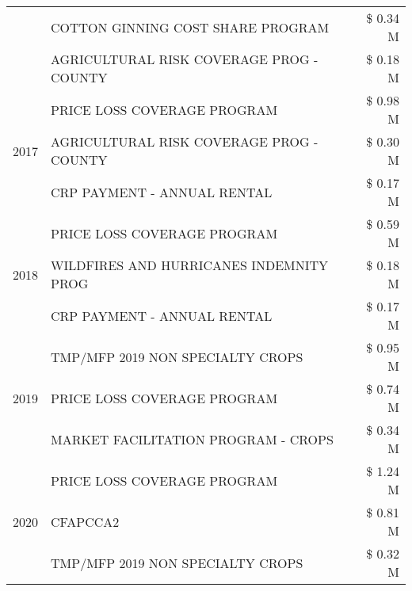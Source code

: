 \begin{tabular}{llr}
 & COTTON GINNING COST SHARE PROGRAM             & \$ 0.34 M \\
 & AGRICULTURAL RISK COVERAGE PROG - COUNTY      & \$ 0.18 M \\
\cline{1-3}
\multirow[t]{3}{*}{2017} & PRICE LOSS COVERAGE PROGRAM & \$ 0.98 M \\
 & AGRICULTURAL RISK COVERAGE PROG - COUNTY & \$ 0.30 M \\
 & CRP PAYMENT - ANNUAL RENTAL & \$ 0.17 M \\
\cline{1-3}
\multirow[t]{3}{*}{2018} & PRICE LOSS COVERAGE PROGRAM & \$ 0.59 M \\
 & WILDFIRES AND HURRICANES INDEMNITY PROG & \$ 0.18 M \\
 & CRP PAYMENT - ANNUAL RENTAL & \$ 0.17 M \\
\cline{1-3}
\multirow[t]{3}{*}{2019} & TMP/MFP 2019 NON SPECIALTY CROPS & \$ 0.95 M \\
 & PRICE LOSS COVERAGE PROGRAM & \$ 0.74 M \\
 & MARKET FACILITATION PROGRAM - CROPS & \$ 0.34 M \\
\cline{1-3}
\multirow[t]{3}{*}{2020} & PRICE LOSS COVERAGE PROGRAM & \$ 1.24 M \\
 & CFAPCCA2 & \$ 0.81 M \\
 & TMP/MFP 2019 NON SPECIALTY CROPS & \$ 0.32 M \\
\cline{1-3}
\bottomrule
\end{tabular}
